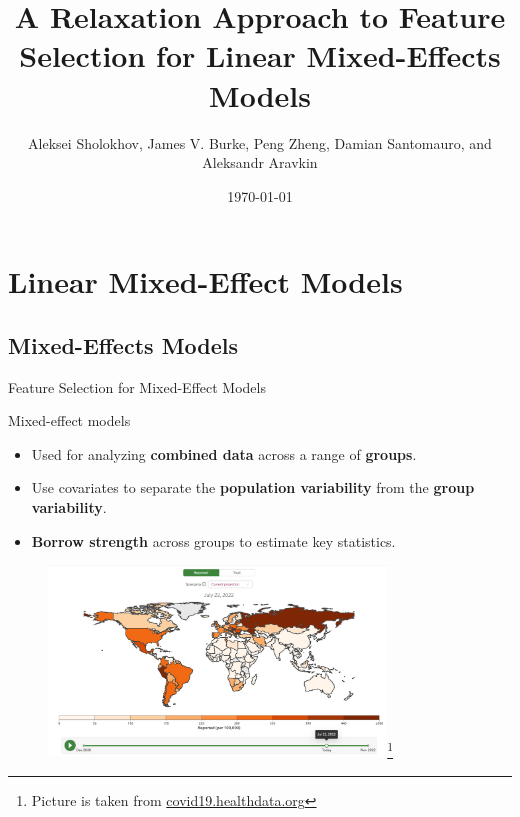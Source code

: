 \documentclass[8pt]{beamer}
\title{A Relaxation Approach to Feature Selection \newline for Linear Mixed-Effects Models}
\date{\today}
\author{Aleksei Sholokhov, James V. Burke, Peng Zheng, Damian Santomauro, and Aleksandr Aravkin}
\begin{document}
\maketitle

\section{Linear Mixed-Effect Models}
\subsection{ Mixed-Effects Models}
\begin{frame}{Feature Selection for Mixed-Effect Models}

Mixed-effect models
\begin{itemize}
	\item Used for analyzing \textbf{combined data} across a range of \textbf{groups}.
	\item Use covariates to separate the \textbf{population variability} from the \textbf{group variability}.
	\item \textbf{Borrow strength} across groups to estimate key statistics. %
\end{itemize}

\begin{figure}
	\centering
	\includegraphics[width=0.8\textwidth]{Figures/ihme_predictions.png}\footnote{Picture is taken from \href{covid19.healthdata.org}{covid19.healthdata.org} }
\end{figure}

\end{frame}
\end{document}
